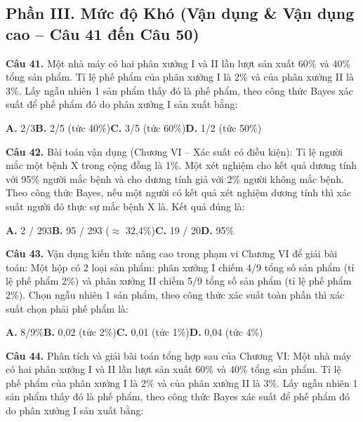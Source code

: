 \documentclass[11pt,a4paper]{article}
\begin{document}
\subsection*{\color{accent} Phần III. Mức độ Khó (Vận dụng \& Vận dụng cao -- Câu 41 đến Câu 50)}
\textbf{\color{primary} Câu 41.} Một nhà máy có hai phân xưởng I và II lần lượt sản xuất 60\% và 40\% tổng sản phẩm. Tỉ lệ phế phẩm của phân xưởng I là 2\% và của phân xưởng II là 3\%. Lấy ngẫu nhiên 1 sản phẩm thấy đó là phế phẩm, theo công thức Bayes xác suất để phế phẩm đó do phân xưởng I sản xuất bằng:\par
\hspace*{1.5em}\textbf{A.} 2/3\quad\quad \textbf{B.} 2/5 (tức 40\%)\quad\quad \textbf{C.} 3/5 (tức 60\%)\quad\quad \textbf{D.} 1/2 (tức 50\%)\par\vspace{2pt}
\textbf{\color{primary} Câu 42.} Bài toán vận dụng (Chương VI – Xác suất có điều kiện): Tỉ lệ người mắc một bệnh X trong cộng đồng là 1\%. Một xét nghiệm cho kết quả dương tính với 95\% người mắc bệnh và cho dương tính giả với 2\% người không mắc bệnh. Theo công thức Bayes, nếu một người có kết quả xét nghiệm dương tính thì xác suất người đó thực sự mắc bệnh X là. Kết quả đúng là:\par
\hspace*{1.5em}\textbf{A.} 2 / 293\quad\quad \textbf{B.} 95 / 293 ($\approx$ 32,4\%)\quad\quad \textbf{C.} 19 / 20\quad\quad \textbf{D.} 95\%\par\vspace{2pt}
\textbf{\color{primary} Câu 43.} Vận dụng kiến thức nâng cao trong phạm vi Chương VI để giải bài toán: Một hộp có 2 loại sản phẩm: phân xưởng I chiếm 4/9 tổng số sản phẩm (tỉ lệ phế phẩm 2\%) và phân xưởng II chiếm 5/9 tổng số sản phẩm (tỉ lệ phế phẩm 2\%). Chọn ngẫu nhiên 1 sản phẩm, theo công thức xác suất toàn phần thì xác suất chọn phải phế phẩm là:\par
\hspace*{1.5em}\textbf{A.} 8/9\%\quad\quad \textbf{B.} 0,02 (tức 2\%)\quad\quad \textbf{C.} 0,01 (tức 1\%)\quad\quad \textbf{D.} 0,04 (tức 4\%)\par\vspace{2pt}
\textbf{\color{primary} Câu 44.} Phân tích và giải bài toán tổng hợp sau của Chương VI: Một nhà máy có hai phân xưởng I và II lần lượt sản xuất 60\% và 40\% tổng sản phẩm. Tỉ lệ phế phẩm của phân xưởng I là 2\% và của phân xưởng II là 3\%. Lấy ngẫu nhiên 1 sản phẩm thấy đó là phế phẩm, theo công thức Bayes xác suất để phế phẩm đó do phân xưởng I sản xuất bằng:\par
\end{document}
